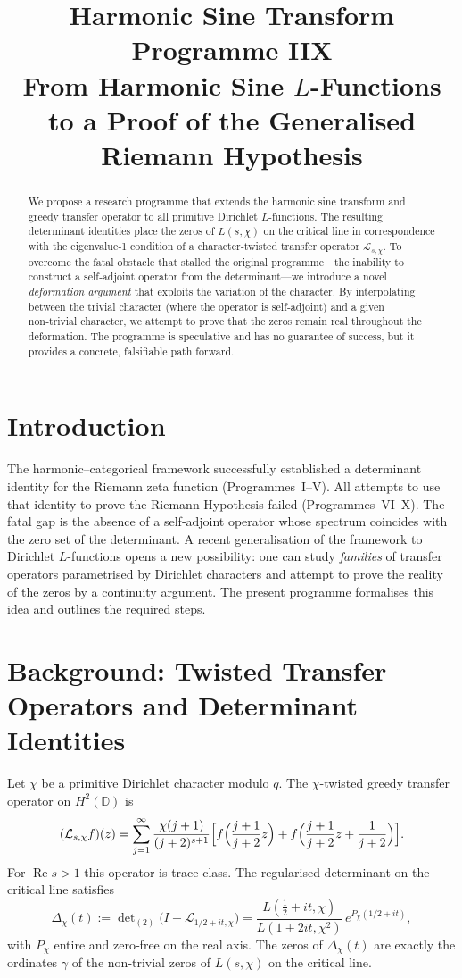 \documentclass[11pt,a4paper]{article}
\title{\bfseries Harmonic Sine Transform Programme IIX\\
\large From Harmonic Sine \(L\)-Functions to a Proof of the Generalised Riemann Hypothesis}
\author{}
\date{}
\begin{document}
\maketitle

\begin{abstract}
We propose a research programme that extends the harmonic sine transform and greedy transfer operator to all primitive Dirichlet \(L\)-functions.  The resulting determinant identities place the zeros of \(L(s,\chi)\) on the critical line in correspondence with the eigenvalue‑1 condition of a character‑twisted transfer operator \(\mathcal{L}_{s,\chi}\).  To overcome the fatal obstacle that stalled the original programme—the inability to construct a self‑adjoint operator from the determinant—we introduce a novel \emph{deformation argument} that exploits the variation of the character.  By interpolating between the trivial character (where the operator is self‑adjoint) and a given non‑trivial character, we attempt to prove that the zeros remain real throughout the deformation.  The programme is speculative and has no guarantee of success, but it provides a concrete, falsifiable path forward.
\end{abstract}

\section{Introduction}
The harmonic–categorical framework successfully established a determinant identity for the Riemann zeta function (Programmes~I–V).  All attempts to use that identity to prove the Riemann Hypothesis failed (Programmes~VI–X).  The fatal gap is the absence of a self‑adjoint operator whose spectrum coincides with the zero set of the determinant.  A recent generalisation of the framework to Dirichlet \(L\)-functions \cite{HSTL} opens a new possibility: one can study \emph{families} of transfer operators parametrised by Dirichlet characters and attempt to prove the reality of the zeros by a continuity argument.  The present programme formalises this idea and outlines the required steps.

\section{Background: Twisted Transfer Operators and Determinant Identities}
Let \(\chi\) be a primitive Dirichlet character modulo \(q\).  The \(\chi\)-twisted greedy transfer operator on \(H^2(\mathbb{D})\) is
\[
(\mathcal{L}_{s,\chi}f)(z) = \sum_{j=1}^\infty \frac{\chi(j+1)}{(j+2)^{s+1}}
\Bigl[ f\Bigl(\frac{j+1}{j+2}z\Bigr) + f\Bigl(\frac{j+1}{j+2}z + \frac{1}{j+2}\Bigr) \Bigr].
\]
For \(\operatorname{Re}s>1\) this operator is trace‑class.  The regularised determinant on the critical line satisfies
\begin{equation}\label{eq:detL}
\Delta_\chi(t) := \det\nolimits_{(2)}\!\big(I-\mathcal{L}_{1/2+it,\chi}\big)
= \frac{L(\frac12+it,\chi)}{L(1+2it,\chi^2)}\, e^{P_\chi(1/2+it)},
\end{equation}
with \(P_\chi\) entire and zero‑free on the real axis.  The zeros of \(\Delta_\chi(t)\) are exactly the ordinates \(\gamma\) of the non‑trivial zeros of \(L(s,\chi)\) on the critical line.
\end{document}
